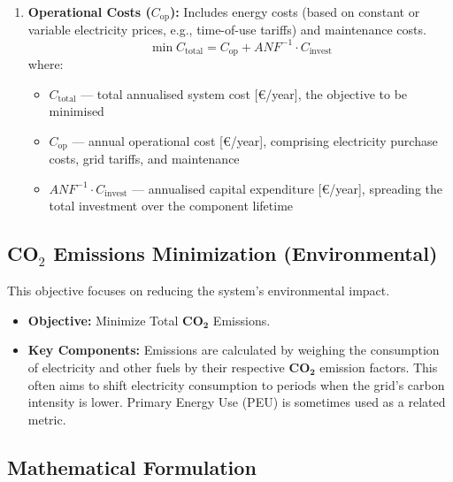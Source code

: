 \documentclass[11pt,a4paper]{report}
\begin{document}
\begin{itemize}
\begin{enumerate}
        \item \textbf{Operational Costs ($C_{\text{op}}$):} Includes energy costs (based on constant or variable electricity prices, e.g., time-of-use tariffs) and maintenance costs.
        $$ \min C_{\text{total}} = C_{\text{op}} + ANF^{-1} \cdot C_{\text{invest}} $$
        \noindent where:
        \begin{itemize}
            \item $C_{\text{total}}$ --- total annualised system cost [\euro/year], the objective to be minimised
            \item $C_{\text{op}}$ --- annual operational cost [\euro/year], comprising electricity purchase costs, grid tariffs, and maintenance
            \item $ANF^{-1} \cdot C_{\text{invest}}$ --- annualised capital expenditure [\euro/year], spreading the total investment over the component lifetime
        \end{itemize}
    \end{enumerate}
\end{itemize}

\subsection*{CO$_2$ Emissions Minimization (Environmental)}

This objective focuses on reducing the system's environmental impact.

\begin{itemize}
    \item \textbf{Objective:} Minimize Total $\mathbf{CO_2}$ Emissions.
    \item \textbf{Key Components:} Emissions are calculated by weighing the consumption of electricity and other fuels by their respective $\mathbf{CO_2}$ emission factors. This often aims to shift electricity consumption to periods when the grid's carbon intensity is lower. Primary Energy Use (PEU) is sometimes used as a related metric.
\end{itemize}

\subsection*{Mathematical Formulation}
\end{document}
